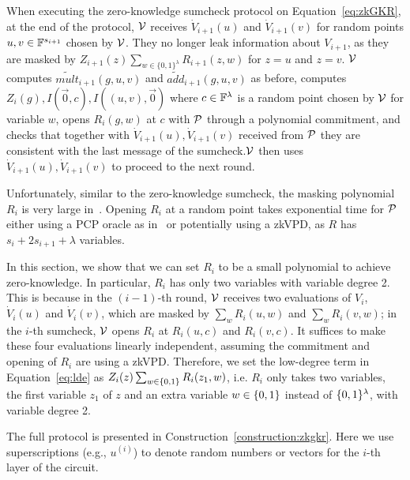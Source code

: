 When executing the zero-knowledge sumcheck protocol on Equation~\ref{eq:zkGKR}, at the end of the protocol, $\V$ receives $\dot{V}_{i+1}(u)$ and $\dot{V}_{i+1}(v)$ for random points $u,v\in\F^{s_{i+1}}$ chosen by $\V$. They no longer leak information about $V_{i+1}$, as they are masked by $Z_{i+1}(z)\sum\nolimits_{w \in \{0, 1\}^\lambda}R_{i+1}(z, w)$ for $z=u$ and $z=v$. $\V$ computes $\tilde{mult}_{i+1}(g,u,v)$ and $\tilde{add}_{i+1}(g,u,v)$ as before, computes $Z_i(g), I(\vec{0},c), I((u,v),\vec{0})$ where $c\in\F^\lambda$ is a random point chosen by $\V$ for variable $w$, opens $R_i(g,w)$ at $c$  with $\P$ through a polynomial commitment, and checks that together with $\dot{V}_{i+1}(u), \dot{V}_{i+1}(v)$ received from $\P$ they are consistent with the last message of the sumcheck.$\V$ then uses $\dot{V}_{i+1}(u), \dot{V}_{i+1}(v)$ to proceed to the next round.

Unfortunately, similar to the zero-knowledge sumcheck, the masking polynomial $R_i$ is very large in~\cite{zksumcheck}. Opening $R_i$ at a random point takes exponential time for $\P$ either using a PCP oracle as in~\cite{zksumcheck} or potentially using a zkVPD, as $R$ has $s_i+2s_{i+1}+\lambda$ variables.

In this section, we show that we can set $R_i$ to be a small polynomial to achieve zero-knowledge. In particular, $R_i$ has only two variables with variable degree 2. This is because in the $(i-1)$-th round, $\V$ receives two evaluations of $V_i$, $\dot{V}_i(u)$ and $\dot{V}_i(v)$,  which are masked by $\sum_{w}R_i(u,w)$ and $\sum_{w}R_i(v,w)$; in the $i$-th sumcheck, $\V$ opens $R_i$ at $R_i(u,c)$ and $R_i(v,c)$. It suffices to make these four evaluations linearly independent, assuming the commitment and opening of $R_i$ are using a zkVPD. Therefore, we set the low-degree term in Equation~\ref{eq:lde} as $Z_i(z)\sum\nolimits_{w \in\binary} R_i(z_1, w)$, i.e. $R_i$ only takes two variables, the first variable $z_1$ of $z$ and an extra variable $w\in\binary$ instead of $\binary^\lambda$, with variable degree 2. 

The full protocol is presented in Construction~\ref{construction:zkgkr}. Here we use superscriptions (e.g., $u^{(i)}$) to denote random numbers or vectors for the $i$-th layer of the circuit.


